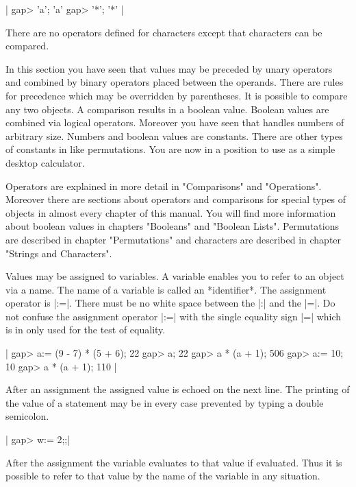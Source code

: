 |    gap> 'a';
    'a'
    gap> '*';
    '*' |

There are no  operators defined for characters except that characters can
be compared.

In  this section  you have  seen  that  values  may be preceded  by unary
operators  and combined  by binary operators placed between the operands.
There  are  rules for precedence which may  be overridden by parentheses.
It  is possible to  compare any  two objects.  A comparison  results in a
boolean value.   Boolean  values  are  combined  via  logical  operators.
Moreover  you have seen that  {\GAP}  handles numbers of arbitrary  size.
Numbers  and boolean values  are  constants.  There  are  other  types of
constants in {\GAP} like permutations.  You  are now in a position to use
{\GAP} as a simple desktop calculator.

Operators are explained in more detail in "Comparisons" and "Operations".
Moreover there are  sections about operators  and comparisons for special
types  of  objects in almost every chapter of this manual.  You will find
more information about boolean values in chapters "Booleans" and "Boolean
Lists".   Permutations  are   described  in  chapter  "Permutations"  and
characters are described in chapter "Strings and Characters".


Values  may be assigned to variables.  A variable enables you to refer to
an object via a name.  The name of a variable is  called an *identifier*.
The assignment operator is  |:=|.   There must  be no white space between
the |:| and the  |=|.  Do  not confuse the assignment operator  |:=| with
the single equality sign |=| which is in {\GAP} only used for the test of
equality.

|    gap> a:= (9 - 7) * (5 + 6);
    22
    gap> a;
    22
    gap> a * (a + 1);
    506
    gap> a:= 10;
    10
    gap> a * (a + 1);
    110 |

After an  assignment the assigned value is echoed on the next  line.  The
printing of the value of  a statement  may be in every case prevented  by
typing a double semicolon.

|    gap> w:= 2;;|

After the  assignment the variable evaluates to that  value if evaluated.
Thus it is possible to refer to that value by the name of the variable in
any situation.


